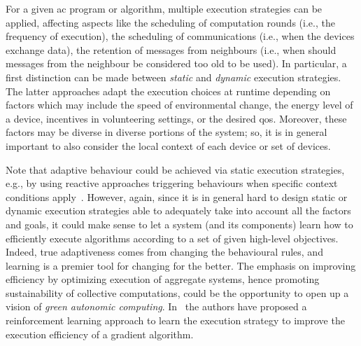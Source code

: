 For a given \ac{ac} program or algorithm,
  multiple execution strategies can be applied,
  affecting aspects like
  the scheduling of computation rounds (i.e., the frequency of execution),
  the scheduling of communications (i.e., when the devices exchange data),
  the retention of messages from neighbours (i.e., when should messages from the neighbour be considered too old to be used).
%
In particular,
 a first distinction 
 can be made between \emph{static}
 and \emph{dynamic} execution strategies.
%
The latter approaches adapt the execution choices
 at runtime depending on factors
 which may include
 the speed of environmental change,
 the energy level of a device,
 incentives in volunteering settings,
 or the desired \ac{qos}.
%
Moreover, these factors may be diverse 
 in diverse portions of the system;
 so, it is in general important to also consider
 the local context of each device or set of devices.

Note that adaptive behaviour
 could be achieved via static execution strategies, e.g., by using reactive approaches triggering behaviours when specific context conditions apply~\cite{danilo2021lmcs}.
%
However, again, 
 since it is in general hard to design static or dynamic execution strategies 
 able to adequately take into account all the factors and goals,
 it could make sense to let a system (and its components) learn 
 how to efficiently execute algorithms 
 according to a set of given high-level objectives.
%
Indeed, true adaptiveness 
 comes from changing the behavioural rules,
 and learning is a premier tool for 
 changing for the better.
%
The emphasis on improving efficiency
 by optimizing execution 
 of aggregate systems,
 hence promoting sustainability
 of collective computations,
 could be the opportunity to open up a vision 
 of \emph{green autonomic computing}.
%
In~\cite{aguzzi2022coord-ac-rl} the authors have proposed a reinforcement learning approach to learn the execution strategy to improve the execution efficiency of a gradient algorithm. %
